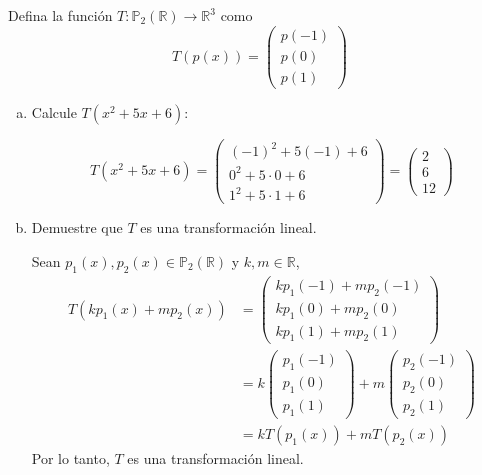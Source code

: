 \begin{example}
Defina la función $T: \mathbb{P}_2(\mathbb{R}) \to \mathbb{R}^3$ como
\[
T(p(x)) = \begin{pmatrix} p(-1) \\ p(0) \\ p(1) \end{pmatrix}
\]
\begin{enumerate}[a.]
    \item Calcule $T(x^2 + 5x + 6)$:
    \begin{myproof}
    \[
    T(x^2 + 5x + 6) = \begin{pmatrix} (-1)^2 + 5(-1) + 6 \\ 0^2 + 5 \cdot 0 + 6 \\ 1^2 + 5 \cdot 1 + 6 \end{pmatrix} = \begin{pmatrix} 2 \\ 6 \\ 12 \end{pmatrix}
    \]
    \end{myproof}
    \item Demuestre que $T$ es una transformación lineal.
    \begin{myproof}
    Sean $p_1(x), p_2(x) \in \mathbb{P}_2(\mathbb{R})$ y $k, m \in \mathbb{R}$,
    \begin{align*}
        T(k p_1(x) + m p_2(x)) &= \begin{pmatrix}
            k p_1(-1) + m p_2(-1) \\
            k p_1(0) + m p_2(0) \\
            k p_1(1) + m p_2(1)
        \end{pmatrix} \\
        &= k \begin{pmatrix} p_1(-1) \\ p_1(0) \\ p_1(1) \end{pmatrix} + m \begin{pmatrix} p_2(-1) \\ p_2(0) \\ p_2(1) \end{pmatrix} \\
        &= k T(p_1(x)) + m T(p_2(x))
    \end{align*}
    Por lo tanto, $T$ es una transformación lineal.
    \end{myproof}
    

\end{enumerate}
\end{example}
